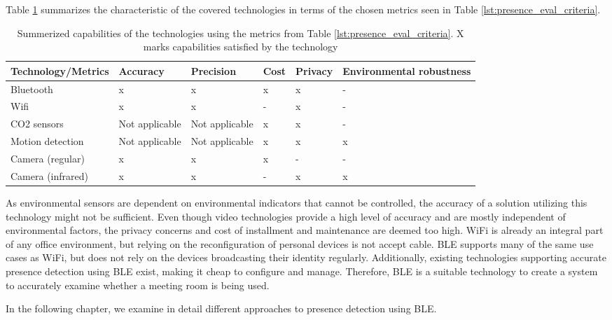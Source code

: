 Table \ref{lst:evaluated_technologies} summarizes the characteristic of the covered technologies in terms of the chosen metrics seen in Table \ref{lst:presence_eval_criteria}.
\begin{table}[H]
    \centering
    \begin{center}
        \begin{tabular}{|l|p{20mm}|p{20mm}|l|l|p{25mm}|}
            \hline
            Technology/Metrics & Accuracy & Precision & Cost & Privacy & Environmental robustness \\ \hline
            Bluetooth          & x        & x         & x    & x       & -                      \\ \hline
            Wifi               & x        & x         & -    & x       & -                      \\ \hline
            CO2 sensors        & Not applicable        & Not applicable         & x    & x       & -                      \\ \hline
            Motion detection   & Not applicable        & Not applicable         & x    & x       & x                      \\ \hline
            Camera (regular)   & x        & x         & x    & -       & -                      \\ \hline
            Camera (infrared)  & x        & x         & -    & x       & x                      \\ \hline
        \end{tabular}
    \end{center}
    \caption{Summerized capabilities of the technologies using the metrics from Table \ref{lst:presence_eval_criteria}. X marks capabilities satisfied by the technology}
    \label{lst:evaluated_technologies}
\end{table}






As environmental sensors are dependent on environmental indicators that cannot be controlled, the accuracy of a solution utilizing this technology might not be sufficient.
Even though video technologies provide a high level of accuracy and are mostly independent of environmental factors, the privacy concerns and cost of installment and maintenance are deemed too high.
WiFi is already an integral part of any office environment, but relying on the reconfiguration of personal devices is not accept    cable. 
BLE supports many of the same use cases as WiFi, but does not rely on the devices broadcasting their identity regularly.
Additionally, existing technologies supporting accurate presence detection using BLE exist, making it cheap to configure and manage. 
Therefore, BLE is a suitable technology to create a system to accurately examine whether a meeting room is being used.

In the following chapter, we examine in detail different approaches to presence detection using BLE.